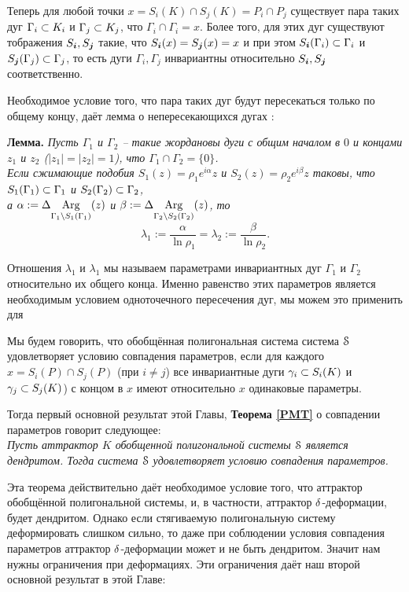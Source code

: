 Теперь для любой точки $x=S_i(K)\cap S_j(K)=P_i\cap P_j$ существует пара таких дуг $\Gamma_i\subset K_i$ и $\Gamma_j\subset K_j$, что $\Gamma_i\cap\Gamma_i=x$.
Более того, для этих дуг существуют тображения $S_{\bm{i}}, S_{\bm{j}}$ такие, что $S_{\bm{i}}(x)=S_{\bm{j}}(x)=x$ и при этом $S_{\bm{i}}(\Gamma_i)\subset\Gamma_i$ и $S_{\bm{j}}(\Gamma_j)\subset\Gamma_j$, то есть дуги $\Gamma_i, \Gamma_j$ инвариантны относительно $S_{\bm{i}}, S_{\bm{j}}$ соответственно.

Необходимое условие того, что пара таких дуг будут пересекаться только по общему концу, даёт лемма о непересекающихся дугах \cite{ATK}:

{\bf Лемма.}
{\em Пусть $\Gamma_1$ и $\Gamma_2$ -- такие жордановы дуги с общим началом в $0$ и  концами $z_1$ и $z_2$ ($|z_1|=|z_2|=1$), что $\Gamma_1\cap\Gamma_2=\{0\}$.\\
Если сжимающие подобия $S_1(z)=\rho_1 e^{i\alpha}z$ и $S_2(z)=\rho_2 e^{i\beta}z$ таковы, что $S_1(\Gamma_1)\subset\Gamma_1$ и $S_2(\Gamma_2)\subset\Gamma_2$,\\ 
а $\alpha:=\Delta\underset{{\Gamma_1\setminus S_1(\Gamma_1)}}{\mathrm {Arg}}(z)$ и $\beta:=\Delta\underset{{\Gamma_2\setminus S_2(\Gamma_2)}}{\mathrm {Arg}}(z)$, то
$$\lambda_1:=\dfrac{\alpha}{\ln\rho_1} = \lambda_2:=\dfrac{\beta}{\ln\rho_2}.$$}

Отношения $\lambda_1$ и $\lambda_1$ мы называем параметрами инвариантных дуг $\Gamma_1$ и $\Gamma_2$ относительно их общего конца.
Именно равенство этих параметров является необходимым условием одноточечного пересечения дуг, мы можем это применить для 


Мы будем говорить, что обобщённая полигональная система система ${\EuScript S}$ удовлетворяет условию совпадения параметров, если для каждого $x=S_i(P)\cap S_j(P)$ (при $i\neq j$) все инвариантные дуги $\gamma_i\subset S_i(K)$ и $\gamma_j\subset S_j(K)$) с концом в $x$ имеют относительно $x$ одинаковые параметры.

Тогда первый основной результат этой Главы, {\bf Теорема \ref{PMT}} о совпадении параметров говорит следующее:\\
{\em
Пусть аттрактор $K$ обобщенной полигональной системы ${\EuScript S}$ является дендритом. 
Тогда система ${\EuScript S}$ удовлетворяет условию совпадения параметров.}

Эта теорема действительно даёт необходимое условие того, что аттрактор обобщённой полигональной системы, и, в частности, аттрактор $\delta$-деформации, будет дендритом. 
Однако если стягиваемую полигональную систему деформировать слишком сильно, то даже при соблюдении условия совпадения параметров аттрактор $\delta$-деформации может и не быть дендритом. 
Значит нам нужны ограничения при деформациях. 
Эти ограничения даёт наш второй основной результат в этой Главе:

